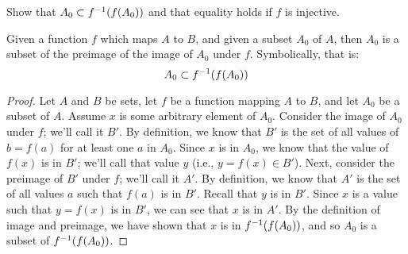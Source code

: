 \documentclass[main.tex]{subfiles}
\begin{document}
\subproblem{}\label{s2p1a}

Show that \(A_0 \subset {f}^{-1}(f(A_0))\) and that equality holds if \(f\)
is injective.

\begin{thm}
	Given a function \(f\) which maps \(A\) to \(B\), and given a subset
	\(A_0\) of \(A\), then \(A_0\) is a subset of the preimage of the image
	of \(A_0\) under \(f\). Symbolically, that is:
	\[A_0 \subset {f}^{-1}(f(A_0))\]
\end{thm}
\begin{proof}
	Let \(A\) and \(B\) be sets, let \(f\) be a function mapping \(A\) to
	\(B\), and let \(A_0\) be a subset of \(A\). Assume \(x\) is some
	arbitrary element of \(A_0\). Consider the image of \(A_0\) under \(f\);
	we'll call it \(B'\). By definition, we know that \(B'\) is the set of
	all values of \(b = f(a)\) for at least one \(a\) in \(A_0\). Since
	\(x\) is in \(A_0\), we know that the value of \(f(x)\) is in \(B'\);
	we'll call that value \(y\) (i.e., \(y = f(x) \in B'\)). Next, consider
	the preimage of \(B'\) under \(f\); we'll call it \(A'\). By definition,
	we know that \(A'\) is the set of all values \(a\) such that \(f(a)\) is
	in \(B'\). Recall that \(y\) is in \(B'\). Since \(x\) is a value such
	that \(y = f(x)\) is in \(B'\), we can see that \(x\) is in \(A'\). By
	the definition of image and preimage, we have shown that \(x\) is in
	\({f}^{-1}(f(A_0))\), and so \(A_0\) is a subset of
	\({f}^{-1}(f(A_0))\).
\end{proof}
\end{document}
